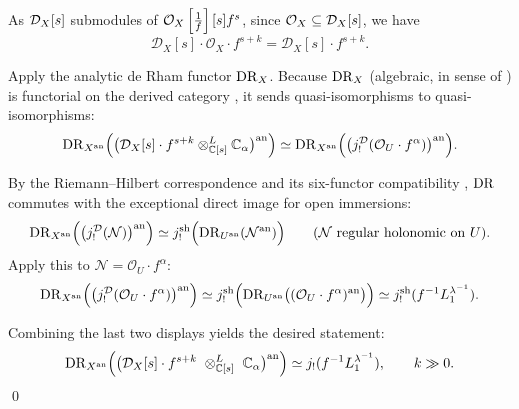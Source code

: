 \begin{remark}
\begin{enumerate}
              As $\mathcal{D}_X[s]$ submodules of $\mathcal{O}_X\left[\frac{1}{f}\right][s]f^s$, since $\mathcal{O}_X \subseteq \mathcal{D}_X[s]$, we have
              \[
                  \mathcal D_X[s]\cdot \mathcal O_X\cdot f^{s+k} = \mathcal D_X[s] \cdot f^{s+k}.
              \]

              Apply the analytic de Rham functor $\mathrm{DR}_X$.
              Because $\mathrm{DR}_X$ (algebraic, in sense of \cite[Sect.~4.7]{hotta2008d}) is functorial on the derived category \cite[Sect.~4.7]{hotta2008d}, it sends quasi-isomorphisms to
              quasi-isomorphisms:
              \[
                  \mathrm{DR}_{X^\mathrm{an}}\Bigl(\bigl(\mathcal D_X[s]\cdot f^{s+k}\otimes^L_{\mathbb{C}[s]}\mathbb{C}_\alpha\bigr)^{\mathrm{an}}\Bigr)
                  \simeq
                  \mathrm{DR}_{X^\mathrm{an}}\Bigl(\bigl(j_!^{\mathcal D}(\mathcal O_U\cdot f^\alpha)\bigr)^{\mathrm{an}}\Bigr).
              \]

              By the Riemann--Hilbert correspondence and its six-functor compatibility \cite[Theorem 7.1.1]{hotta2008d},
              $\mathrm{DR}$ commutes with the exceptional direct image for open immersions:
              \[
                  \mathrm{DR}_{X^\mathrm{an}}\Bigl(\bigl(j_!^{\mathcal D}(\mathcal N)\bigr)^{\mathrm{an}}\Bigr)
                  \simeq
                  j_!^{\mathrm{sh}}\Bigl(\mathrm{DR}_{U^\mathrm{an}}(\mathcal N^{\mathrm{an}})\Bigr)
                  \qquad (\mathcal N\ \text{regular holonomic on }U).
              \]
              Apply this to $\mathcal N=\mathcal O_U\cdot f^\alpha$:
              \[
                  \mathrm{DR}_{X^\mathrm{an}}\Bigl(\bigl(j_!^{\mathcal D}(\mathcal O_U\cdot f^\alpha)\bigr)^{\mathrm{an}}\Bigr)
                  \simeq
                  j_!^{\mathrm{sh}}\Bigl(\mathrm{DR}_{U^\mathrm{an}}\bigl((\mathcal O_U\cdot f^\alpha)^{\mathrm{an}}\bigr)\Bigr)
                  \simeq
                  j_!^{\mathrm{sh}}(f^{-1}L_1^{\lambda^{-1}}).
              \]

              Combining the last two displays yields the desired statement:
              \[
                  \mathrm{DR}_{X^\mathrm{an}}\Bigl(\bigl(\mathcal D_X[s]\cdot f^{s+k}\ \otimes^L_{\mathbb{C}[s]}\ \mathbb{C}_\alpha \bigr)^{\mathrm{an}}\Bigr)
                  \simeq j_!(f^{-1}L_1^{\lambda^{-1}}),
                  \qquad k\gg 0.
              \]
              \qed

    \end{enumerate}

\end{remark}

